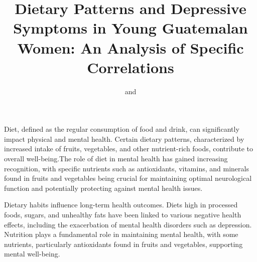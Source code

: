 \documentclass[jou]{apa7}
\title{Dietary Patterns and Depressive Symptoms in Young Guatemalan Women: An Analysis of Specific Correlations}
\author{
	\addORCIDlink{Camila Heredia, M.D.}{0009-0008-9550-9083} and \addORCIDlink{Lic. María Andrée Neumann}{0009-0001-2531-6058}
}
\begin{document}
	\maketitle





	
	


	Diet, defined as the regular consumption of food and drink, can significantly impact physical and mental health. Certain dietary patterns, characterized by increased intake of fruits, vegetables, and other nutrient-rich foods, contribute to overall well-being.The role of diet in mental health has gained increasing recognition, with specific nutrients such as antioxidants, vitamins, and minerals found in fruits and vegetables being crucial for maintaining optimal neurological function and potentially protecting against mental health issues.


	Dietary habits influence long-term health outcomes. Diets high in processed foods, sugars, and unhealthy fats have been linked to various negative health effects, including the exacerbation of mental health disorders such as depression. Nutrition plays a fundamental role in maintaining mental health, with some nutrients, particularly antioxidants found in fruits and vegetables, supporting mental well-being.
\end{document}

